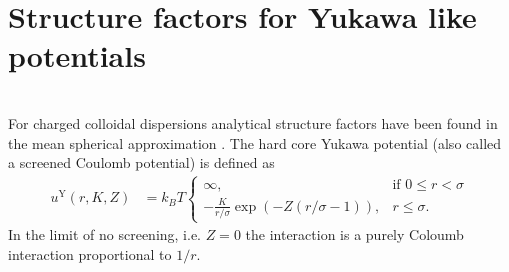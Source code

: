 \clearpage
\section{Structure factors for Yukawa like potentials}~\\
\label{sect:SQ4Yukawa}
For charged colloidal dispersions analytical structure factors have been found in the mean spherical approximation \cite{Hayter1981,Hansen1982,Liu2005}. The hard core Yukawa potential (also called a screened Coulomb potential) is defined as
\begin{align}
u^\mathrm{Y}(r,K,Z) &= k_BT \begin{cases}
                             \infty, & \mbox{if } 0\leq r < \sigma \\
                             -\frac{K}{r/\sigma}\exp(-Z (r/\sigma-1)), & r\leq \sigma.
                            \end{cases}
\end{align}
In the limit of no screening, i.e. $Z=0$ the interaction is a purely Coloumb interaction proportional to $1/r$.

